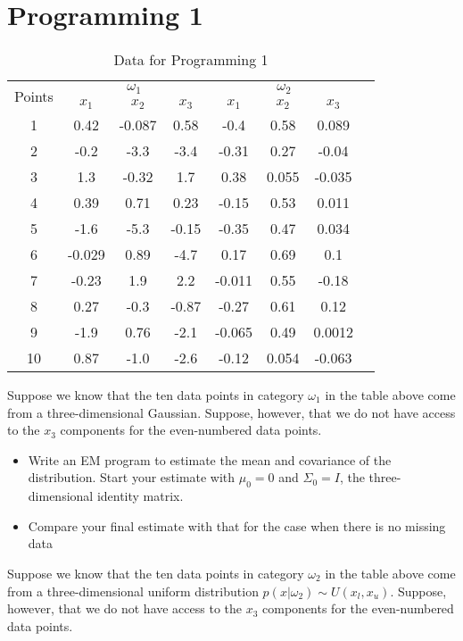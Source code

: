 \documentclass{article}
\theoremstyle{definition}
\theoremstyle{definition}
\theoremstyle{remark}
\begin{document}
\section*{Programming 1}
\begin{table}
\centering
\begin{tabular}{|c|c|c|c|c|c|c|c|}
\hline
\multirow{2}{*}{Points} & \multicolumn{3}{|c|}{$\omega_1$} & \multicolumn{3}{|c|}{$\omega_2$} \\
\cline{2-7}
& $x_1$ & $x_2$ & $x_3$ & $x_1$ & $x_2$ & $x_3$ \\
\hline
1 & 0.42 & -0.087 & 0.58 & -0.4 & 0.58 & 0.089\\
\hline
2 & -0.2 & -3.3 & -3.4 & -0.31 & 0.27 & -0.04\\
\hline
3 & 1.3 & -0.32 & 1.7 & 0.38 & 0.055 & -0.035\\
\hline
4 & 0.39 & 0.71 & 0.23 & -0.15 & 0.53 & 0.011\\
\hline
5 & -1.6 & -5.3 & -0.15 & -0.35 & 0.47 & 0.034\\
\hline
6 & -0.029 & 0.89 & -4.7 & 0.17 & 0.69 & 0.1\\
\hline
7 & -0.23 & 1.9 & 2.2 & -0.011 & 0.55 & -0.18\\
\hline
8 & 0.27 & -0.3 & -0.87 & -0.27 & 0.61 & 0.12\\
\hline
9 & -1.9 & 0.76 & -2.1 & -0.065 & 0.49 & 0.0012\\
\hline
10 & 0.87 & -1.0 & -2.6 & -0.12 & 0.054 & -0.063\\
\hline

\end{tabular}
\caption{Data for Programming 1}
\end{table}

Suppose we know that the ten data points in category $\omega_1$ in the table above come
from a three-dimensional Gaussian. Suppose, however, that we do not have access to
the $x_3$ components for the even-numbered data points.
\begin{itemize}
  \item Write an EM program to estimate the mean and covariance of the distribution.
Start your estimate with $\mu_0 = 0$ and $\Sigma_0 = I$, the three-dimensional identity
matrix.
  \item Compare your final estimate with that for the case when there is no missing data
\end{itemize}

Suppose we know that the ten data points in category $\omega_2$ in the table above
come from a three-dimensional uniform distribution $p(x|\omega_2) \sim U(x_l, x_u)$. Suppose,
however, that we do not have access to the $x_3$ components for the even-numbered
data points.
\end{document}
